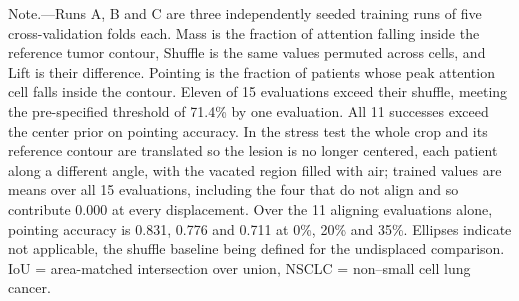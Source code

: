 \documentclass[11pt]{article}
\begin{document}
\begin{table}[H]
\medskip
\footnotesize
Note.---Runs A, B and C are three independently seeded training runs of five
cross-validation folds each. Mass is the fraction of attention falling inside the
reference tumor contour, Shuffle is the same values permuted across cells, and
Lift is their difference. Pointing is the fraction of patients whose peak
attention cell falls inside the contour. Eleven of 15 evaluations exceed their
shuffle, meeting the pre-specified threshold of 71.4\% by one evaluation. All 11
successes exceed the center prior on pointing accuracy. In the stress test the
whole crop and its reference contour are translated so the lesion is no longer
centered, each patient along a different angle, with the vacated region filled
with air; trained values are means over all 15 evaluations, including the four
that do not align and so contribute 0.000 at every displacement. Over the 11
aligning evaluations alone, pointing accuracy is 0.831, 0.776 and 0.711 at 0\%,
20\% and 35\%. Ellipses indicate not applicable, the shuffle baseline being
defined for the undisplaced comparison.
IoU = area-matched intersection over union,
NSCLC = non--small cell lung cancer.
\end{table}
\end{document}
